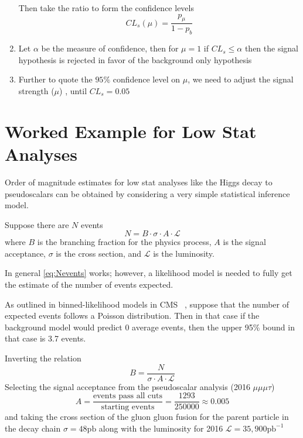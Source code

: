 \begin{enumerate}
{   Then take the ratio to form the confidence levels
  \begin{equation} CL_s (\mu)  = \frac{p_\mu}{1-p_b}\end{equation}
  }
  \item{ Let $\alpha$ be the measure of confidence, then for $\mu=1$ if $CL_s \leq \alpha$ then the signal hypothesis is rejected in favor of the background only hypothesis}
  \item {Further to quote the $95\%$ confidence level on $\mu$, we need to adjust the signal strength ($\mu$) , until $CL_s = 0.05$}
\end{enumerate}


\section{Worked Example for Low Stat Analyses}
Order of magnitude estimates for low stat analyses like the Higgs decay to pseudoscalars can be obtained by considering a very simple statistical inference model. 

Suppose there are $N$ events 
\begin{equation}
\label{eq:Nevents}
N = B\cdot \sigma \cdot A\cdot \mathcal{L}
\end{equation}
where $B$ is the branching fraction for the physics process, $A$ is the signal acceptance, $\sigma$ is the cross section, and $\mathcal{L}$ is the luminosity.


In general \ref{eq:Nevents} works; however, a likelihood model is needed to fully get the estimate of the number of events expected. 

As outlined in binned-likelihood models in CMS ~\cite{Cowan_2011}, suppose that the number of expected events follows a Poisson distribution. Then in that case if the background model would predict 0 average events, then the upper 95\% bound in that case is 3.7 events. 

Inverting the relation
\begin{equation}B = \frac{N}{\sigma \cdot A\cdot \mathcal{L}}\end{equation}
Selecting the signal acceptance from the pseudoscalar analysis (2016 $\mu\mu\mu\tau$) 
\begin{equation} A = \frac{\text{events pass all cuts}}{\text{starting events}} = \frac{1293}{250000} \approx 0.005 \end{equation}
and taking the cross section of the gluon gluon fusion for the parent particle in the decay chain $\sigma = 48 \text{pb}$ along with the luminosity for 2016 $\mathcal{L} = 35,900 \text{pb}^{-1}$

